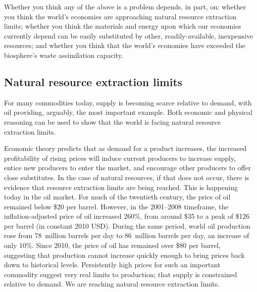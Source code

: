 Whether you think any of the above is a problem depends, in part, on:
whether you think the world's economies are approaching 
	natural resource extraction limits;
whether you think the materials and energy upon which our economies currently depend
	can be easily substituted by other, readily-available, inexpensive resources; and
whether you think that the world's economies have exceeded 
	the biosphere's waste assimilation capacity.


\subsection{Natural resource extraction limits}
\label{sub:natural_resource_extraction_limits}

For many commodities today, 
supply is becoming scarce relative to demand, 
with oil providing, arguably, the most important example. 
Both economic and physical reasoning can be used to show that the world is facing
natural resource extraction limits.

Economic theory predicts that as demand for a product increases,
the increased profitability of rising prices 
will induce current producers to increase supply, 
entice new producers to enter the market,
and encourage other producers to offer close substitutes. 
In the case of natural resources, if that does not occur,
there is evidence that resource extraction limits are being reached.
This is happening today in the oil market.
For much of the twentieth century, the price of oil remained below \$20 per barrel.
However, in the 2001--2008 timeframe,
the inflation-adjusted price of oil increased 260\%,
from around \$35 to a peak of \$126 per barrel 
(in constant 2010 USD).
During the same period,
world oil production rose from 
78~million barrels per day to 86~million barrels per day,
an increase of only 10\%.\cite{EIA2014}
Since 2010, the price of oil has remained over \$80 per barrel,
suggesting that production cannot increase quickly enough to bring prices
back down to historical levels.
Persistently high prices for such an important commodity
suggest very real limits to production; 
that supply is constrained relative to demand. 
We are reaching natural resource extraction limits.

